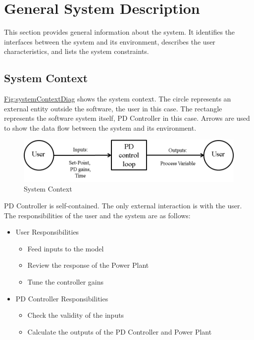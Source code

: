 \documentclass[12pt]{article}
\begin{document}
\section{General System Description}
\label{Sec:GenSysDesc}
This section provides general information about the system. It identifies the interfaces between the system and its environment, describes the user characteristics, and lists the system constraints.

\subsection{System Context}
\label{Sec:SysContext}
\hyperref[Figure:systemContextDiag]{Fig:systemContextDiag} shows the system context. The circle represents an external entity outside the software, the user in this case. The rectangle represents the software system itself, PD Controller in this case. Arrows are used to show the data flow between the system and its environment.

\begin{figure}[H]
\begin{center}
\includegraphics[width=\textwidth]{../../../../datafiles/pdcontroller/Fig_SystemContext.png}
\caption{System Context}
\label{Figure:systemContextDiag}
\end{center}
\end{figure}
PD Controller is self-contained. The only external interaction is with the user. The responsibilities of the user and the system are as follows:

\begin{itemize}
\item{User Responsibilities}
\begin{itemize}
\item{Feed inputs to the model}
\item{Review the response of the Power Plant}
\item{Tune the controller gains}
\end{itemize}
\item{PD Controller Responsibilities}
\begin{itemize}
\item{Check the validity of the inputs}
\item{Calculate the outputs of the PD Controller and Power Plant}
\end{itemize}
\end{itemize}
\end{document}
